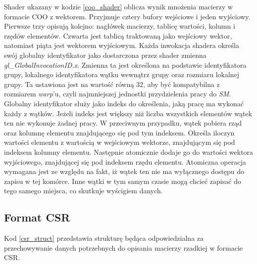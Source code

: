 Shader ukazany w kodzie \ref{coo_shader} oblicza wynik mnożenia macierzy w formacie COO z wektorem.
Przyjmuje cztery bufory wejściowe i jeden wyjściowy.
Pierwsze trzy opisują kolejno: nagłówek macierzy, tablicę wartości, kolumn i rzędów elementów.
Czwarta jest tablicą traktowaną jako wejściowy wektor, natomiast piąta jest wektorem wyjściowym. 
Każda inwokacja shadera określa swój globalny identyfikator jako dostarczona przez shader zmienna \textit{gl\_GlobalInvocationID.x}.
Zmienna ta jest określona na podstawie identyfikatora grupy, lokalnego identyfikatora wątku wewnątrz grupy oraz rozmiaru lokalnej grupy.
Ta ustawiona jest na wartość równą 32, aby być kompatybilna z rozmiarem \textit{warp}'u, czyli najmniejszej jednostki przydzielenia pracy do \textit{SM}.
Globalny identyfikator służy jako indeks do określenia, jaką pracę ma wykonać każdy z wątków.
Jeżeli indeks jest większy niż liczba wszystkich elementów wątek ten nie wykonuje żadnej pracy.
W przeciwnym przypadku, wątek pobiera rząd oraz kolumnę elementu znajdującego się pod tym indeksem.
Określa iloczyn wartości elementu z wartością w wejściowym wektorze, znajdującym się pod indeksem kolumny elementu.
Następnie atomicznie dodaje go do wartości wektora wyjściowego, znajdującej się pod indeksem rzędu elementu.
Atomiczna operacja wymagana jest ze względu na fakt, iż wątek ten nie ma wyłącznego dostępu do zapisu w tej komórce.
Inne wątki w tym samym czasie mogą chcieć zapisać do tego samego miejsca, co skutkuje wyścigiem danych.

\pagebreak

\subsection{Format CSR}
\label{cha:csr_impl}

Kod \ref{csr_struct} przedstawia strukturę będąca odpowiedzialna za przechowywanie danych potrzebnych do opisania macierzy rzadkiej w formacie CSR.

